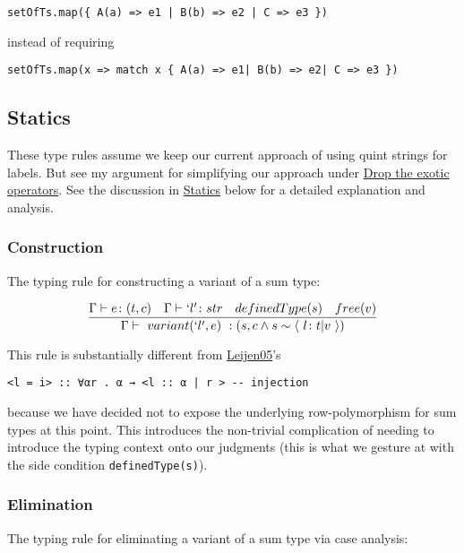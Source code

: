 \documentclass[11pt]{article}
\begin{document}
\begin{verbatim}
setOfTs.map({ A(a) => e1 | B(b) => e2 | C => e3 })
\end{verbatim}

instead of requiring

\begin{verbatim}
setOfTs.map(x => match x { A(a) => e1| B(b) => e2| C => e3 })
\end{verbatim}

\subsection{Statics}
\label{sec:org04cad71}
These type rules assume we keep our current approach of using quint
strings for labels. But see my argument for simplifying our approach
under \hyperref[sec:orgd5aba72]{Drop the exotic operators}. See the
discussion in \hyperref[sec:org6da5dcb]{Statics} below for a detailed explanation and
analysis.

\subsubsection{Construction}
\label{sec:org23575b1}
The typing rule for constructing a variant of a sum type:

$$
\frac
{
\Gamma \vdash e \colon (t, c) \quad
\Gamma \vdash `l' \colon str \quad
definedType(s) \quad
free(v)
}
{
\Gamma \vdash \ variant(`l', e) \ :
(s, c \land s \sim \langle \ l \colon t | v \ \rangle)
}
$$


This rule is substantially different from \href{https://www.microsoft.com/en-us/research/publication/extensible-records-with-scoped-labels/}{Leijen05}'s

\begin{verbatim}
<l = i> :: ∀αr . α → <l :: α | r > -- injection
\end{verbatim}


because we have decided not to expose the underlying row-polymorphism for sum
types at this point. This introduces the non-trivial complication of needing to
introduce the typing context onto our judgments (this is what we gesture at with
the side condition \texttt{definedType(s)}).

\subsubsection{Elimination}
\label{sec:orgf258cbd}

The typing rule for eliminating a variant of a sum type via case
analysis:
\end{document}
